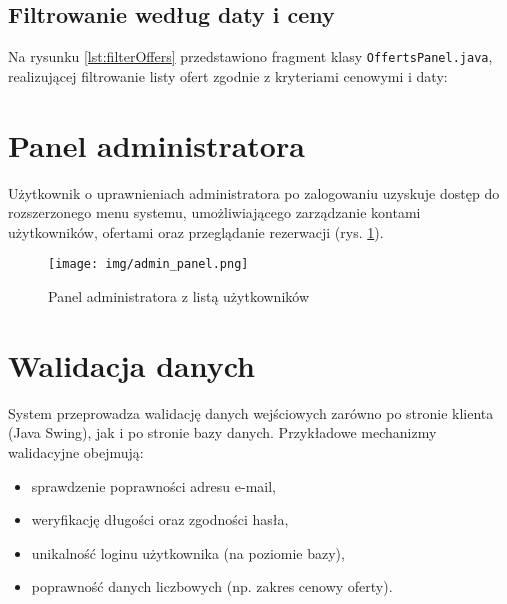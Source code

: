 \subsection{Filtrowanie według daty i ceny}

Na rysunku \ref{lst:filterOffers} przedstawiono fragment klasy \texttt{OffertsPanel.java}, realizującej filtrowanie listy ofert zgodnie z kryteriami cenowymi i daty:



\section{Panel administratora}

Użytkownik o uprawnieniach administratora po zalogowaniu uzyskuje dostęp do rozszerzonego menu systemu, umożliwiającego zarządzanie kontami użytkowników, ofertami oraz przeglądanie rezerwacji (rys. \ref{fig:adminpanel}).

\begin{figure}[H]
    \centering
    \texttt{[image: img/admin\_panel.png]}
    \caption{Panel administratora z listą użytkowników}
    \label{fig:adminpanel}
\end{figure}

\section{Walidacja danych}

System przeprowadza walidację danych wejściowych zarówno po stronie klienta (Java Swing), jak i po stronie bazy danych. Przykładowe mechanizmy walidacyjne obejmują:

\begin{itemize}
    \item sprawdzenie poprawności adresu e-mail,
    \item weryfikację długości oraz zgodności hasła,
    \item unikalność loginu użytkownika (na poziomie bazy),
    \item poprawność danych liczbowych (np. zakres cenowy oferty).
\end{itemize}
